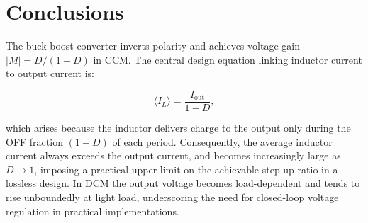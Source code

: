 \documentclass[12pt,a4paper]{article}
\newcommand{\Iout}{I_{\mathrm{out}}}
\newcommand{\ILavg}{\langle I_L \rangle}
\begin{document}
\section{Conclusions}
\label{sec:conclusions}

The buck-boost converter inverts polarity and achieves voltage gain
$|M| = D/(1-D)$ in CCM.
The central design equation linking inductor current to output current is:

\begin{equation*}
  \ILavg = \frac{\Iout}{1-D},
\end{equation*}

which arises because the inductor delivers charge to the output only
during the OFF fraction $(1-D)$ of each period.
Consequently, the average inductor current always exceeds the output
current, and becomes increasingly large as $D \to 1$, imposing a
practical upper limit on the achievable step-up ratio in a
lossless design.
In DCM the output voltage becomes load-dependent and tends to rise
unboundedly at light load, underscoring the need for closed-loop
voltage regulation in practical implementations.
\end{document}
